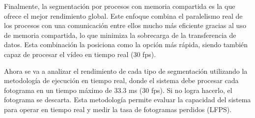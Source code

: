 \documentclass[11pt,spanish,listoffigures,listoftables]{tfgetsinf}
\begin{document}
Finalmente, la segmentación por procesos con memoria compartida es la que ofrece el mejor rendimiento global. Este enfoque combina el paralelismo real de los procesos con una comunicación entre ellos mucho más eficiente gracias al uso de memoria compartida, lo que minimiza la sobrecarga de la transferencia de datos. Esta combinación la posiciona como la opción más rápida, siendo también capaz de procesar el vídeo en tiempo real (30 fps).

Ahora se va a analizar el rendimiento de cada tipo de segmentación utilizando la metodología de ejecución en tiempo real, donde el sistema debe procesar cada fotograma en un tiempo máximo de 33.3 ms (30 fps). Si no logra hacerlo, el fotograma se descarta. Esta metodología permite evaluar la capacidad del sistema para operar en tiempo real y medir la tasa de fotogramas perdidos (LFPS).
\end{document}
